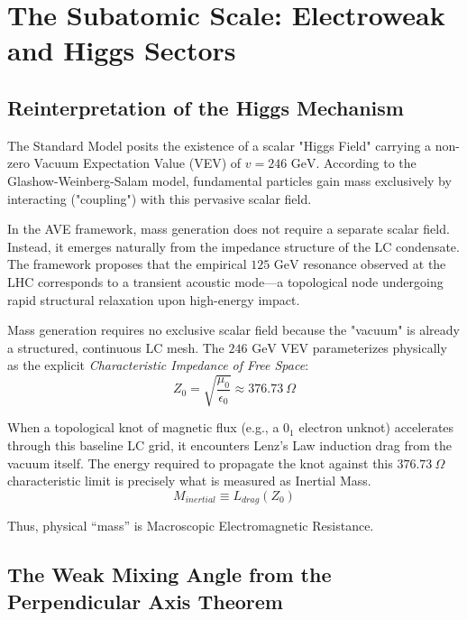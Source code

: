 \chapter{The Subatomic Scale: Electroweak and Higgs Sectors}
\label{ch:electroweak_higgs}

\section{Reinterpretation of the Higgs Mechanism}
The Standard Model posits the existence of a scalar "Higgs Field" carrying a non-zero Vacuum Expectation Value (VEV) of $v = 246 \text{ GeV}$. According to the Glashow-Weinberg-Salam model, fundamental particles gain mass exclusively by interacting ("coupling") with this pervasive scalar field.

In the AVE framework, mass generation does not require a separate scalar field. Instead, it emerges naturally from the impedance structure of the LC condensate. The framework proposes that the empirical $125 \text{ GeV}$ resonance observed at the LHC corresponds to a transient acoustic mode---a topological node undergoing rapid structural relaxation upon high-energy impact.

Mass generation requires no exclusive scalar field because the "vacuum" is already a structured, continuous LC mesh. The $246 \text{ GeV}$ VEV parameterizes physically as the explicit \textit{Characteristic Impedance of Free Space}:
\begin{equation}
    Z_0 = \sqrt{\frac{\mu_0}{\epsilon_0}} \approx 376.73 \ \Omega
\end{equation}

When a topological knot of magnetic flux (e.g., a $0_1$ electron unknot) accelerates through this baseline LC grid, it encounters Lenz's Law induction drag from the vacuum itself. The energy required to propagate the knot against this $376.73 \ \Omega$ characteristic limit is precisely what is measured as Inertial Mass. 
\begin{equation}
    M_{inertial} \equiv L_{drag}(Z_0)
\end{equation}

Thus, physical ``mass'' is Macroscopic Electromagnetic Resistance.

\section{The Weak Mixing Angle from the Perpendicular Axis Theorem}


